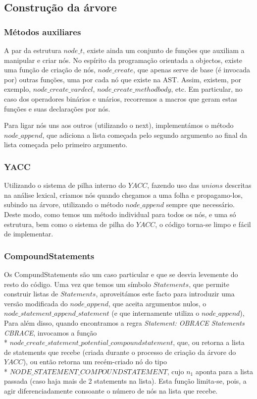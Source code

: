 \documentclass[11pt,a4paper]{article}
\begin{document}
\subsection{Construção da árvore}

\subsubsection{Métodos auxiliares}

A par da estrutura $node\_t$, existe ainda um conjunto de funções que auxiliam a manipular e criar nós. No espírito da programação orientada a objectos, existe uma função de criação de nós, $node\_create$, que apenas serve de base (é invocada por) outras funções, uma por cada nó que existe na AST. Assim, existem, por exemplo, $node\_create\_vardecl$, $node\_create\_methodbody$, etc. Em particular, no caso dos operadores binários e unários, recorremos a macros que geram estas funções e suas declarações por nós.

Para ligar nós uns aos outros (utilizando o next), implementámos o método $node\_append$, que adiciona a lista começada pelo segundo argumento ao final da lista começada pelo primeiro argumento.

\subsubsection{YACC}

Utilizando o sistema de pilha interno do $YACC$, fazendo uso das $unions$ descritas na análise lexical, criamos nós quando chegamos a uma folha e propagamo-los, subindo na árvore, utilizando o método $node\_append$ sempre que necessário. Deste modo, como temos um método individual para todos os nós, e uma só estrutura, bem como o sistema de pilha do $YACC$, o código torna-se limpo e fácil de implementar.

\subsubsection{CompoundStatements}

Os CompundStatements são um caso particular e que se desvia levemente do resto do código. Uma vez que temos um símbolo $Statements$, que permite construir listas de $Statements$, aproveitámos este facto para introduzir uma versão modificada do $node\_append$, que aceita argumentos nulos, o $node\_statement\_append\_statement$ (e que internamente utiliza o $node\_append$), Para além disso, quando encontramos a regra \emph{Statement: OBRACE Statements CBRACE}, invocamos a função   \\* $node\_create\_statement\_potential\_compoundstatement$, que, ou retorna a lista de statements que recebe (criada durante o processo de criação da árvore do $YACC$), ou então retorna um recém-criado nó do tipo   \\* $NODE\_STATEMENT\_COMPOUNDSTATEMENT$, cujo $n_1$ aponta para a lista passada (caso haja mais de 2 statements na lista). Esta função limita-se, pois, a agir diferenciadamente consoante o número de nós na lista que recebe.
\end{document}

